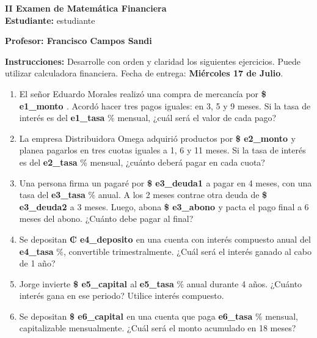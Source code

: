 
\begin{center}
    {\LARGE \textbf{II Examen de Matemática Financiera}}\\[1em]
    {\large \textbf{Estudiante:} {{ estudiante }}}
\end{center}

\vspace{1cm}

\textbf{Profesor: Francisco Campos Sandi}

\textbf{Instrucciones:} Desarrolle con orden y claridad los siguientes ejercicios. Puede utilizar calculadora financiera. Fecha de entrega: \textbf{Miércoles 17 de Julio}.

\begin{enumerate}
  \item El señor Eduardo Morales realizó una compra de mercancía por \textbf{\$ {{ e1_monto }}}. Acordó hacer tres pagos iguales: en 3, 5 y 9 meses. Si la tasa de interés es del \textbf{{ e1_tasa }}\% mensual, ¿cuál será el valor de cada pago?

  \item La empresa Distribuidora Omega adquirió productos por \textbf{\$ {{ e2_monto }}} y planea pagarlos en tres cuotas iguales a 1, 6 y 11 meses. Si la tasa de interés es del \textbf{{ e2_tasa }}\% mensual, ¿cuánto deberá pagar en cada cuota?

  \item Una persona firma un pagaré por \textbf{\$ {{ e3_deuda1 }}} a pagar en 4 meses, con una tasa del \textbf{{ e3_tasa }}\% anual. A los 2 meses contrae otra deuda de \textbf{\$ {{ e3_deuda2 }}} a 3 meses. Luego, abona \textbf{\$ {{ e3_abono }}} y pacta el pago final a 6 meses del abono. ¿Cuánto debe pagar al final?

  \item Se depositan \textbf{₡{{ e4_deposito }}} en una cuenta con interés compuesto anual del \textbf{{ e4_tasa }}\%, convertible trimestralmente. ¿Cuál será el interés ganado al cabo de 1 año?

  \item Jorge invierte \textbf{\$ {{ e5_capital }}} al \textbf{{ e5_tasa }}\% anual durante 4 años. ¿Cuánto interés gana en ese periodo? Utilice interés compuesto.

  \item Se depositan \textbf{\$ {{ e6_capital }}} en una cuenta que paga \textbf{{ e6_tasa }}\% mensual, capitalizable mensualmente. ¿Cuál será el monto acumulado en 18 meses?
\end{enumerate}
